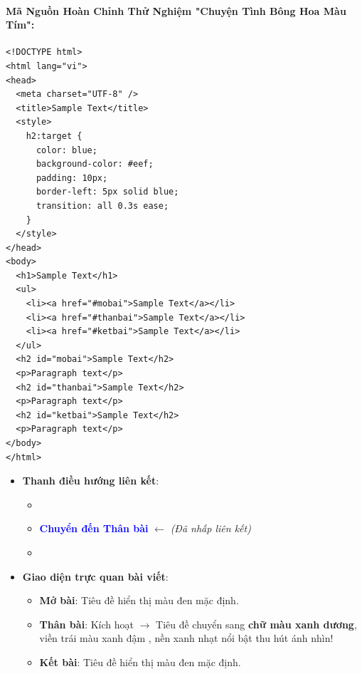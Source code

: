 \paragraph{Mã Nguồn Hoàn Chỉnh Thử Nghiệm "Chuyện Tình Bông Hoa Màu Tím":}

\begin{codeWindow}
\begin{lstlisting}[language=HTML5]
<!DOCTYPE html>
<html lang="vi">
<head>
  <meta charset="UTF-8" />
  <title>Sample Text</title>
  <style>
    h2:target {
      color: blue;
      background-color: #eef;
      padding: 10px;
      border-left: 5px solid blue;
      transition: all 0.3s ease;
    }
  </style>
</head>
<body>
  <h1>Sample Text</h1>
  <ul>
    <li><a href="#mobai">Sample Text</a></li>
    <li><a href="#thanbai">Sample Text</a></li>
    <li><a href="#ketbai">Sample Text</a></li>
  </ul>
  <h2 id="mobai">Sample Text</h2>
  <p>Paragraph text</p>
  <h2 id="thanbai">Sample Text</h2>
  <p>Paragraph text</p>
  <h2 id="ketbai">Sample Text</h2>
  <p>Paragraph text</p>
</body>
</html>
\end{lstlisting}
\end{codeWindow}

\begin{browserWindow}
\sffamily\small
\begin{itemize}[leftmargin=1.5em, itemsep=3pt, parsep=0pt]
    \item \textbf{Thanh điều hướng liên kết}:
    \begin{itemize}[leftmargin=1.2em, itemsep=2pt]
        \item {}
        \item \textcolor{blue}{\textbf{Chuyển đến Thân bài}} $\leftarrow$ \textit{(Đã nhấp liên kết)}
        \item {}
    \end{itemize}
    \item \textbf{Giao diện trực quan bài viết}:
    \begin{itemize}[leftmargin=1.2em, itemsep=2pt]
        \item \textbf{Mở bài}: Tiêu đề  hiển thị màu đen mặc định.
        \item \textbf{Thân bài}: Kích hoạt  $\rightarrow$ Tiêu đề chuyển sang \textbf{chữ màu xanh dương}, viền trái màu xanh đậm , nền xanh nhạt nổi bật thu hút ánh nhìn!
        \item \textbf{Kết bài}: Tiêu đề  hiển thị màu đen mặc định.
    \end{itemize}
\end{itemize}
\end{browserWindow}


